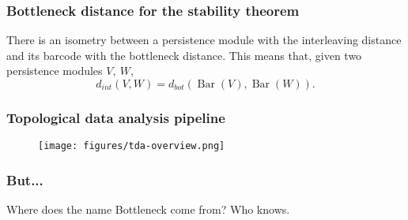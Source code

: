 \documentclass[aspectratio=169]{beamer}
\newcommand{\brc}{\operatorname{Bar}}
\begin{document}
\begin{frame}
  \frametitle{Bottleneck distance for the stability theorem}
  \begin{theorem}[Stability]
    There is an isometry between a persistence module with the interleaving distance and its barcode with the bottleneck distance. This means that, given two persistence modules $ V, \ W $, 
    $$ 
        d_{int} (V, W) = d_{bot} (\brc(V), \brc(W)).
    $$
\end{theorem}
\end{frame}

\begin{frame}
  \frametitle{Topological data analysis pipeline}
  \begin{figure}
    \texttt{[image: figures/tda-overview.png]}
  \end{figure}
\end{frame}

\begin{frame}
  \frametitle{But...}

  Where does the name Bottleneck come from? Who knows.
\end{frame}
\end{document}
